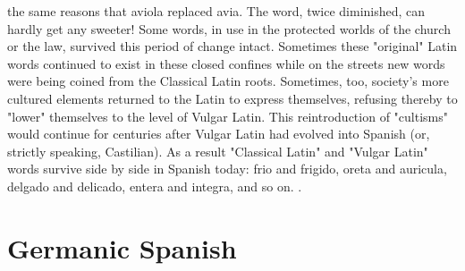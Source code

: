 \documentclass[14pt,a4paper,oneside]{memoir}
\begin{document}
{{{{the same reasons that aviola replaced avia. The word, twice diminished, can hardly get any sweeter!
Some words, in use in the protected worlds of the church or
the law, survived this period of change intact. Sometimes these "original" Latin words continued to exist in these closed confines while
on the streets new words were being coined from the Classical Latin
roots. Sometimes, too, society's more cultured elements returned to
the Latin to express themselves, refusing thereby to "lower" themselves to the level of Vulgar Latin. This reintroduction of "cultisms"
would continue for centuries after Vulgar Latin had evolved into Spanish (or, strictly speaking, Castilian). As a result "Classical Latin" and
"Vulgar Latin" words survive side by side in Spanish today: frio and
frigido, oreta and auricula, delgado and delicado, entera and integra,
and so on. .

\section{Germanic Spanish}

}}}}
\end{document}
